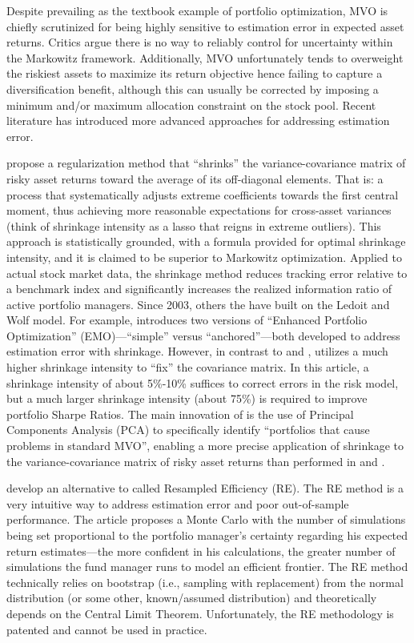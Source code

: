\documentclass[12pt,letterpaper]{article}
\begin{document}
Despite prevailing as the textbook example of portfolio optimization, MVO is chiefly scrutinized for being highly sensitive to estimation error in expected asset returns. Critics argue there is no way to reliably control for uncertainty within the Markowitz framework. Additionally, MVO unfortunately tends to overweight the riskiest assets to maximize its return objective hence failing to capture a diversification benefit, although this can usually be corrected by imposing a minimum and/or maximum allocation constraint on the stock pool. Recent literature has introduced more advanced approaches for addressing estimation error.

 propose a regularization method that “shrinks” the variance-covariance matrix of risky asset returns toward the average of its off-diagonal elements. That is: a process that systematically adjusts extreme coefficients towards the first central moment, thus achieving more reasonable expectations for cross-asset variances (think of shrinkage intensity as a lasso that reigns in extreme outliers). This approach is statistically grounded, with a formula provided for optimal shrinkage intensity, and it is claimed to be superior to Markowitz optimization. Applied to actual stock market data, the shrinkage method reduces tracking error relative to a benchmark index and significantly increases the realized information ratio of active portfolio managers. Since 2003, others \cite{bodnar22, pedersen21} the have built on the Ledoit and Wolf model. For example,  introduces two versions of “Enhanced Portfolio Optimization” (EMO)—“simple” versus “anchored”—both developed to address estimation error with shrinkage. However, in contrast to  and ,  utilizes a much higher shrinkage intensity to “fix” the covariance matrix. In this article, a shrinkage intensity of about 5\%-10\% suffices to correct errors in the risk model, but a much larger shrinkage intensity (about 75\%) is required to improve portfolio Sharpe Ratios. The main innovation of   is the use of  Principal Components Analysis (PCA) to specifically identify “portfolios that cause problems in standard MVO”, enabling a more precise application of shrinkage to the variance-covariance matrix of risky asset returns than performed in  and .

 develop an alternative to  called Resampled Efficiency (RE). The RE method is a very intuitive way to address estimation error and poor out-of-sample performance. The article proposes a Monte Carlo with the number of simulations being set proportional to the portfolio manager’s certainty regarding his expected return estimates---the more confident in his calculations, the greater number of simulations the fund manager runs to model an efficient frontier. The RE method technically relies on bootstrap (i.e., sampling with replacement) from the normal distribution (or some other, known/assumed distribution) and theoretically depends on the Central Limit Theorem. Unfortunately, the RE methodology is patented and cannot be used in practice.
\end{document}
